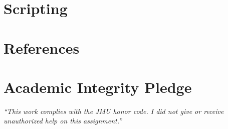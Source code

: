 \documentclass{article}
\begin{document}
\section*{Scripting}





\newpage
\section*{References}

\vfill 
  \section*{Academic Integrity Pledge}
   {\color{red}\textit{“This work complies with the JMU honor code. I did not give or receive unauthorized help on this assignment.”}}
\end{document}

